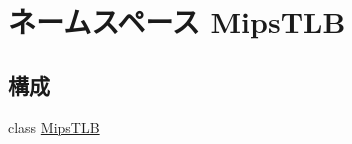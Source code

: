 \hypertarget{namespaceMipsTLB}{
\section{ネームスペース MipsTLB}
\label{namespaceMipsTLB}
}
\subsection*{構成}
\begin{DoxyCompactItemize}
\item 
class \hyperlink{classMipsTLB_1_1MipsTLB}{MipsTLB}
\end{DoxyCompactItemize}
